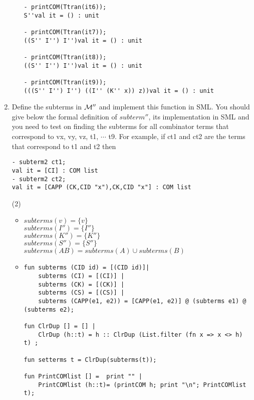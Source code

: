 \documentclass[11pt]{article}
\newcommand \cM {\cal M}
\begin{document}
\begin{enumerate}
\begin{itemize}
\begin{verbatim}
- printCOM(Ttran(it6));
S''val it = () : unit

- printCOM(Ttran(it7));
((S'' I'') I'')val it = () : unit

- printCOM(Ttran(it8));
((S'' I'') I'')val it = () : unit

- printCOM(Ttran(it9));
(((S'' I'') I'') ((I'' (K'' x)) z))val it = () : unit

	      	      \end{verbatim}
	      \end{itemize}
	      \color{black}
	\item
	      Define the subterms in $\cM''$ and implement this function in SML.
	      You should give below the formal definition of $subterm''$, its implementation   in SML and you need to test on finding the subterms for all combinator terms that correspond to  vx, vy, vz, t1, $\cdots$ t9.  For example, if ct1 and ct2  are the terms that correspond to t1 and t2 then
	      \begin{verbatim}
- subterm2 ct1;
val it = [CI] : COM list
- subterm2 ct2;
val it = [CAPP (CK,CID "x"),CK,CID "x"] : COM list
	      \end{verbatim}
	      \hfill{(2)} %
	      
	      \color{red}
	      \begin{itemize}
	      	\item
	      	      $subterms(v) = \{v\}$\\
	      	      $subterms(I'') = \{I''\}$\\
	      	      $subterms(K'') = \{K''\}$\\
	      	      $subterms(S'') = \{S''\}$\\
	      	      $subterms(AB) = subterms(A) \cup subterms(B)$\\
	      	     
	      	\item
	      	      \begin{verbatim}
fun	subterms (CID id) = [(CID id)]|
	subterms (CI) = [(CI)] |
	subterms (CK) = [(CK)] |
	subterms (CS) = [(CS)] |
	subterms (CAPP(e1, e2)) = [CAPP(e1, e2)] @ (subterms e1) @ (subterms e2);
	
fun ClrDup [] = [] |
    ClrDup (h::t) = h :: ClrDup (List.filter (fn x => x <> h) t) ;

fun setterms t = ClrDup(subterms(t));

fun PrintCOMlist [] =  print "" |
    PrintCOMlist (h::t)= (printCOM h; print "\n"; PrintCOMlist t);


\end{verbatim}
\end{itemize}
\end{enumerate}
\end{document}

